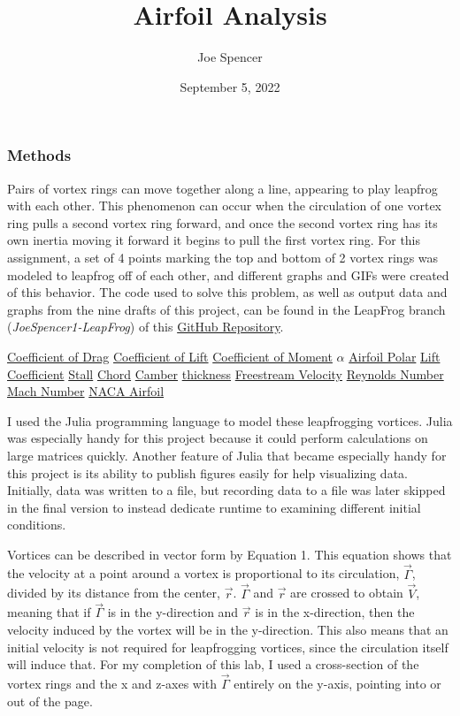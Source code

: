 \documentclass{article}
\begin{document}
\author{Joe Spencer}
\title{Airfoil Analysis}
\date{September 5, 2022}
\maketitle

\subsubsection*{Methods}
Pairs of vortex rings can move together along a line, appearing to play leapfrog with each other. This phenomenon can occur when the circulation of one vortex ring pulls a second vortex ring forward, and once the second vortex ring has its own inertia moving it forward it begins to pull the first vortex ring. For this assignment, a set of 4 points marking the top and bottom of 2 vortex rings was modeled to leapfrog off of each other, and different graphs and GIFs were created of this behavior. The code used to solve this problem, as well as output data and graphs from the nine drafts of this project, can be found in the LeapFrog branch (\emph{JoeSpencer1-LeapFrog}) of this \href{https://github.com/JoeSpencer1/497R-Projects.git}{GitHub Repository}. \newline

\hyperlink{CD}{Coefficient of Drag} \hyperlink{CL}{Coefficient of Lift} \hyperlink{CM}{Coefficient of Moment} \hyperlink{alpha}{$\alpha$} \hyperlink{AP}{Airfoil Polar} \hyperlink{LC}{Lift Coefficient} \hyperlink{ST}{Stall} \hyperlink{c}{Chord} \hyperlink{Camber}{Camber} \hyperlink{Th}{thickness} \hyperlink{Vinf}{Freestream Velocity} \hyperlink{Re}{Reynolds Number} \hyperlink{M}{Mach Number} \hyperlink{NACA}{NACA Airfoil}

I used the Julia programming language to model these leapfrogging vortices. Julia was especially handy for this project because it could perform calculations on large matrices quickly. Another feature of Julia that became especially handy for this project is its ability to publish figures easily for help visualizing data. Initially, data was written to a file, but recording data to a file was later skipped in the final version to instead dedicate runtime to examining different initial conditions.\newline

Vortices can be described in vector form by Equation 1. This equation shows that the velocity at a point around a vortex is proportional to its circulation, $\vec{\Gamma}$, divided by its distance from the center, $\vec{r}$. $\vec{\Gamma}$ and $\vec{r}$ are crossed to obtain $\vec{V}$, meaning that if $\vec{\Gamma}$ is in the y-direction and $\vec{r}$ is in the x-direction, then the velocity induced by the vortex will be in the y-direction. This also means that an initial velocity is not required for leapfrogging vortices, since the circulation itself will induce that. For my completion of this lab, I used a cross-section of the vortex rings and the x and z-axes with $\vec{\Gamma}$ entirely on the y-axis, pointing into or out of the page.  \newline
\end{document}
